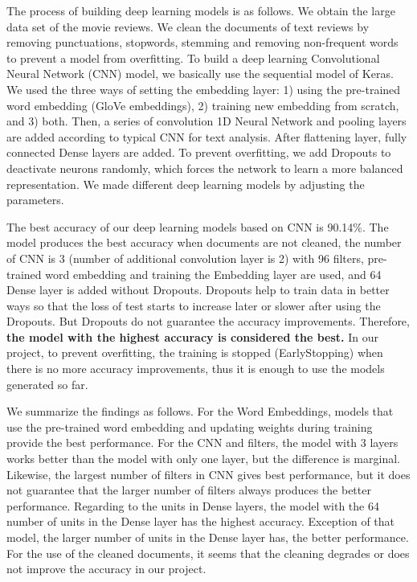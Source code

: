 \documentclass[11pt]{article}
\begin{document}
%
The process of building deep learning models is as follows.
We obtain the large data set of the movie reviews. 
We clean the documents of text reviews by removing punctuations, stopwords, stemming and removing non-frequent words to prevent a model from overfitting.
%
To build a deep learning Convolutional Neural Network (CNN) model, we basically use the sequential model of Keras. 
%
We used the three ways of setting the embedding layer: 1) using the pre-trained word embedding (GloVe embeddings), 2) training new embedding from scratch, and 3) both.
%
Then, a series of convolution 1D Neural Network and pooling layers are added according to typical CNN for text analysis. After flattening layer, fully connected Dense layers are added. To prevent overfitting, we add Dropouts to deactivate neurons randomly, which forces the network to learn a more balanced representation. We made different deep learning models by adjusting the parameters.

The best accuracy of our deep learning models based on CNN is 90.14\%.
The model produces the best accuracy
when documents are not cleaned,
the number of CNN is 3 (number of additional convolution layer is 2) with 96 filters,
pre-trained word embedding and training the Embedding layer are used, and
64 Dense layer is added without Dropouts.
%
Dropouts help to train data in better ways so 
that the loss of test starts to increase later or slower 
after using the Dropouts. 
But Dropouts do not guarantee the accuracy improvements.
Therefore, \textbf{the model with the highest accuracy is considered the best.}
%
In our project, to prevent overfitting, the training is stopped (EarlyStopping) 
when there is no more accuracy improvements, thus 
it is enough to use the models generated so far.

We summarize the findings as follows.
For the Word Embeddings, models that use the pre-trained word embedding and updating weights during training provide the best performance.
For the CNN and filters,
the model with 3 layers works better than the model with only one layer, but the difference is marginal. 
Likewise, the largest number of filters in CNN gives best performance, but it does not guarantee that the larger number of filters always produces the better performance.
%
Regarding to the units in Dense layers, the model with the 64 number of units in the Dense layer has the highest accuracy. Exception of that model, the larger number of units in the Dense layer has, the better performance.
%
For the use of the cleaned documents,
it seems that the cleaning degrades or does not improve the accuracy in our project.
\end{document}
